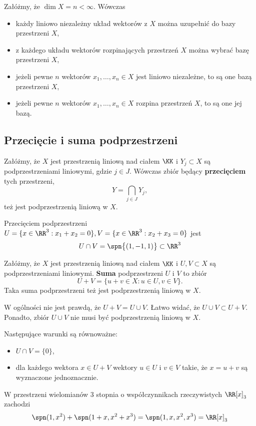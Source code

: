 Załóżmy, że $\dim{X}=n<\infty$. Wówczas
\begin{itemize}
    \item każdy liniowo niezależny układ wektorów z $X$ można uzupełnić do bazy przestrzeni $X$,
    \item z każdego układu wektorów rozpinających przestrzeń $X$ można wybrać bazę przestrzeni $X$,
    \item jeżeli pewne $n$ wektorów $x_1,\ldots,x_n\in X$ jest liniowo niezależne, to są one bazą przestrzeni $X$,
    \item jeżeli pewne $n$ wektorów $x_1,\ldots,x_n\in X$ rozpina przestrzeń $X$, to są one jej bazą.
\end{itemize}

\subsection{Przecięcie i suma podprzestrzeni}

Załóżmy, że $X$ jest przestrzenią liniową nad ciałem $\KK$ i $Y_j\subset X$ są podprzestrzeniami liniowymi, gdzie $j\in J$. Wówczas zbiór będący \textbf{przecięciem} tych przestrzeni,
$$
Y = \bigcap_{j\in J}Y_j,
$$
też jest podprzestrzenią liniową w $X$.

\begin{example}
    Przecięciem podprzestrzeni $U = \{ x \in \RR^3 : x_1 + x_2 = 0\}, V = \{x \in \RR^3 : x_2 + x_3 = 0\}$ jest
    $$U \cap V = \spn\big\{(1, -1, 1)\big\} \subset \RR^3$$
\end{example}

Załóżmy, że $X$ jest przestrzenią liniową nad ciałem $\KK$ i $U,V\subset X$ są podprzestrzeniami liniowymi. \textbf{Suma} podprzestrzeni $U$ i $V$ to zbiór
$$
U + V = \{u+v\in X : u\in U, v\in V\}.
$$
Taka suma podprzestrzeni też jest podprzestrzenią liniową w $X$.

W ogólności nie jest prawdą, że $U+V=U\cup V$. Łatwo widać, że $U\cup V\subset U+V$. Ponadto, zbiór $U\cup V$ nie musi być podprzestrzenią liniową w $X$.

Następujące warunki są równoważne:
\begin{itemize}
    \item $U\cap V=\{0\}$,
    \item dla każdego wektora $x\in U+V$ wektory $u\in U$ i $v\in V$ takie, że $x=u+v$ są wyznaczone jednoznacznie.
\end{itemize}

\begin{example}
    W przestrzeni wielomianów 3 stopnia o współczynnikach rzeczywistych $\RR[x]_3$ zachodzi
    $$\spn(1, x^2) + \spn(1 + x, x^2 + x^3) = \spn(1, x, x^2, x^3) = \RR[x]_3$$
\end{example}

